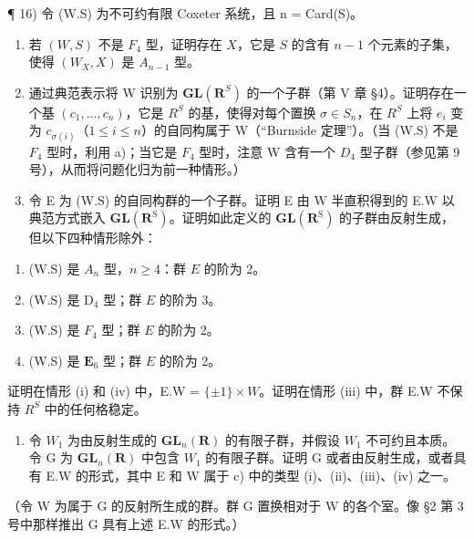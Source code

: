 ¶ 16) 令 (W.S) 为不可约有限 Coxeter 系统，且 n = Card(S)。

\begin{enumerate}
\def\labelenumi{\alph{enumi})}
\item
  若 \((W, S)\) 不是 \(F_4\) 型，证明存在 \(X\)，它是 \(S\) 的含有 \(n - 1\) 个元素的子集，使得 \((W_X, X)\) 是 \(A_{n-1}\) 型。
\item
  通过典范表示将 W 识别为 \(\mathbf{GL}(\mathbf{R}^{S})\) 的一个子群（第 V 章 §4）。证明存在一个基 \((c_{1},\ldots,c_{n})\)，它是 \(R^{S}\) 的基，使得对每个置换 \(\sigma\in S_{n}\)，在 \(R^{S}\) 上将 \(e_{i}\) 变为 \(c_{\sigma(i)}\)（\(1\leqslant i\leqslant n\)）的自同构属于 W（``Burnside 定理''）。（当 (W.S) 不是 \(F_{4}\) 型时，利用 a)；当它是 \(F_{4}\) 型时，注意 W 含有一个 \(D_{4}\) 型子群（参见第 9 号），从而将问题化归为前一种情形。）
\item
  令 E 为 (W.S) 的自同构群的一个子群。证明 E 由 W 半直积得到的 E.W 以典范方式嵌入 \(\mathbf{GL}(\mathbf{R}^{\mathrm{S}})\)。证明如此定义的 \(\mathbf{GL}(\mathbf{R}^{\mathrm{S}})\) 的子群由反射生成，但以下四种情形除外：
\end{enumerate}

\begin{enumerate}
\def\labelenumi{(\roman{enumi})}
\item
  (W.S) 是 \(A_{n}\) 型，\(n \geqslant 4\)：群 \(E\) 的阶为 2。
\item
  (W.S) 是 \(\mathrm{D}_4\) 型；群 \(E\) 的阶为 3。
\item
  (W.S) 是 \(F_4\) 型；群 \(E\) 的阶为 2。
\item
  (W.S) 是 \(\mathbf{E}_6\) 型；群 \(E\) 的阶为 2。
\end{enumerate}

证明在情形 (i) 和 (iv) 中，E.W = \(\{\pm1\} \times W\)。证明在情形 (iii) 中，群 E.W 不保持 \(R^{S}\) 中的任何格稳定。

\begin{enumerate}
\def\labelenumi{\alph{enumi})}
\setcounter{enumi}{3}
\tightlist
\item
  令 \(W_{1}\) 为由反射生成的 \(\mathbf{GL}_{n}(\mathbf{R})\) 的有限子群，并假设 \(W_{1}\) 不可约且本质。令 G 为 \(\mathbf{GL}_{n}(\mathbf{R})\) 中包含 \(W_{1}\) 的有限子群。证明 G 或者由反射生成，或者具有 E.W 的形式，其中 E 和 W 属于 c) 中的类型 (i)、(ii)、(iii)、(iv) 之一。
\end{enumerate}

（令 W 为属于 G 的反射所生成的群。群 G 置换相对于 W 的各个室。像 §2 第 3 号中那样推出 G 具有上述 E.W 的形式。）
\relax{}
